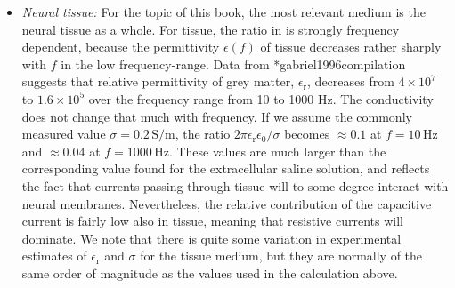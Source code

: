 \begin{itemize}
\item \textit{Neural tissue:} For the topic of this book, the most relevant medium is the neural tissue as a whole. For tissue, the ratio in  is strongly frequency dependent, because the permittivity $\epsilon(f)$ of tissue decreases rather sharply with $f$ in the low frequency-range. Data from \citeasnoun**{gabriel1996compilation} suggests that relative permittivity of grey matter, $\epsilon_\text{r}$, decreases from $4\times10^7$ to $1.6\times 10^5$ over the frequency range from 10 to 1000 \si{\hertz}. The conductivity does not change that much with frequency. If we assume the commonly measured value $\sigma = 0.2 \, \si{\siemens\per\metre}$, the ratio $2\pi\epsilon_\text{r}\epsilon_0/\sigma$ becomes $\approx 0.1$ at $f = 10 \, \si{\hertz}$ and $\approx 0.04 $ at $f = 1000 \, \si{\hertz}$. These values are much larger than the corresponding value found for the extracellular saline solution, and reflects the fact that currents passing through tissue will to some degree interact with neural membranes. Nevertheless, the relative contribution of the capacitive current is fairly low also in tissue, meaning that resistive currents will dominate. We note that there is quite some variation in experimental estimates of  $\epsilon_\text{r}$ and $\sigma$ for the tissue medium, but they are normally of the same order of magnitude as the values used in the calculation above.
\end{itemize}










